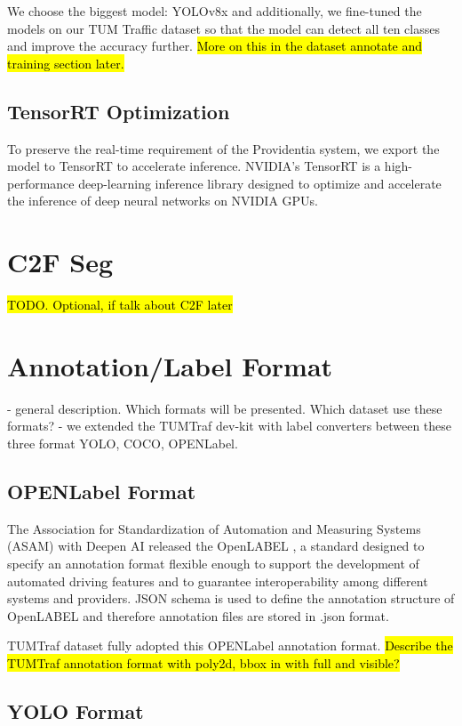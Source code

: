 We choose the biggest model: YOLOv8x and additionally, we fine-tuned the models on our TUM Traffic dataset so that the model can detect all ten classes and improve the accuracy further. \hl{More on this in the dataset annotate and training section later.}

\subsection{TensorRT Optimization}

To preserve the real-time requirement of the Providentia system, we export the model to TensorRT to accelerate inference. NVIDIA’s TensorRT  \cite{vanholder2016efficient} is a high-performance deep-learning inference library designed to optimize and accelerate the inference of deep neural networks on NVIDIA GPUs. 

\section{C2F Seg}
\hl{TODO. Optional, if talk about C2F later}


\section{Annotation/Label Format}

- general description. Which formats will be presented. Which dataset use these formats? 
- we extended the TUMTraf dev-kit with label converters between these three format YOLO, COCO, OPENLabel. 

\subsection{OPENLabel Format}

The Association for Standardization of Automation and Measuring Systems (ASAM) with Deepen AI released the OpenLABEL  \cite{openlabel}, a standard designed to specify an annotation format flexible enough to support the development of automated driving features and to guarantee interoperability among different systems and providers. JSON schema is used to define the annotation structure of OpenLABEL and therefore annotation files are stored in .json format. 

TUMTraf dataset fully adopted this OPENLabel annotation format. \hl{Describe the TUMTraf annotation format with poly2d, bbox in with full and visible?}

\subsection{YOLO Format}


